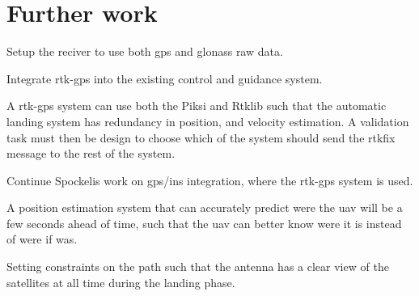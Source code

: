\section{Further work}
Setup the reciver to use both gps and glonass raw data.

Integrate \gls{rtk-gps} into the existing control and guidance system.

A \gls{rtk-gps} system can use both the Piksi and Rtklib such that the automatic landing system has redundancy in position, and velocity estimation. A validation task must then be design to choose which of the system should send the rtkfix message to the rest of the system.

Continue Spockelis work on gps/ins integration, where the rtk-gps system is used.

A position estimation system that can accurately predict were the \gls{uav} will be a few seconds ahead of time, such that the \gls{uav} can better know were it is instead of were if was.

Setting constraints on the path such that the antenna has a clear view of the satellites at all time during the landing phase. 
\cleardoublepage